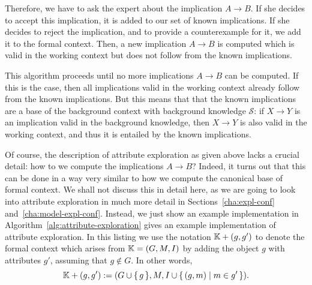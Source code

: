 Therefore, we have to ask the expert about the implication $A \to B$.  If she decides to
accept this implication, it is added to our set of known implications.  If she decides to
reject the implication, and to provide a counterexample for it, we add it to the formal
context.  Then, a new implication $A \to B$ is computed which is valid in the working
context but does not follow from the known implications.

This algorithm proceeds until no more implications $A \to B$ can be computed.  If this is
the case, then all implications valid in the working context already follow from the known
implications.  But this means that that the known implications are a base of the
background context with background knowledge $\mathcal{S}$: if $X \to Y$ is an implication
valid in the background knowledge, then $X \to Y$ is also valid in the working context,
and thus it is entailed by the known implications.

Of course, the description of attribute exploration as given above lacks a crucial detail:
how to we compute the implications $A \to B$?  Indeed, it turns out that this can be done
in a way very similar to how we compute the canonical base of formal context.  We shall
not discuss this in detail here, as we are going to look into attribute exploration in
much more detail in Sections~\ref{cha:expl-conf} and~\ref{cha:model-expl-conf}.  Instead,
we just show an example implementation in Algorithm~\ref{alg:attribute-exploration} gives
an example implementation of attribute exploration.  In this listing we use the notation
${\mathbb{K}} + (g,g')$ to denote the formal context which arises from ${\mathbb{K}} = (G, M, I)$ by adding
the object $g$ with attributes $g'$, assuming that $g \notin G$.  In other words,
\begin{equation*}
  {\ensuremath{\mathbb{K}}} + (g,g') := (G \cup {\ensuremath{\{\,g\,\}}}, M, I \cup {\ensuremath{\{\, (g, m) \mid m \in g' \,\}}}).
\end{equation*}

